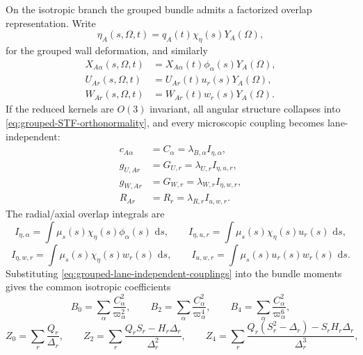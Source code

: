 \documentclass[11pt]{article}
\theoremstyle{definition}
\newcommand{\dd}{\,\mathrm{d}}
\begin{document}
On the isotropic branch the grouped bundle admits a factorized overlap representation. Write
\begin{equation}
\eta_A(s,\Omega,t)=q_A(t)\chi_\eta(s)Y_A(\Omega),
\label{eq:grouped-wall-factorization}
\end{equation}
for the grouped wall deformation, and similarly
\begin{align}
X_{A\alpha}(s,\Omega,t)&=X_{A\alpha}(t)\phi_\alpha(s)Y_A(\Omega),
\nonumber\\
U_{Ar}(s,\Omega,t)&=U_{Ar}(t)u_r(s)Y_A(\Omega),
\nonumber\\
W_{Ar}(s,\Omega,t)&=W_{Ar}(t)w_r(s)Y_A(\Omega).
\label{eq:grouped-factorized-support-gauge}
\end{align}
If the reduced kernels are $O(3)$ invariant, all angular structure collapses into \eqref{eq:grouped-STF-orthonormality}, and every microscopic coupling becomes lane-independent:
\begin{align}
c_{A\alpha}&=C_\alpha=\lambda_{B,\alpha}I_{\eta,\alpha},
\nonumber\\
g_{U,Ar}&=G_{U,r}=\lambda_{U,r}I_{\eta,u,r},
\nonumber\\
g_{W,Ar}&=G_{W,r}=\lambda_{W,r}I_{\eta,w,r},
\nonumber\\
R_{Ar}&=R_r=\lambda_{R,r}I_{u,w,r}.
\label{eq:grouped-lane-independent-couplings}
\end{align}
The radial/axial overlap integrals are
\begin{equation}
I_{\eta,\alpha}=\int \mu_s(s)\chi_\eta(s)\phi_\alpha(s)\,\dd s,
\qquad
I_{\eta,u,r}=\int \mu_s(s)\chi_\eta(s)u_r(s)\,\dd s,
\label{eq:grouped-overlap-integrals-a}
\end{equation}
\begin{equation}
I_{\eta,w,r}=\int \mu_s(s)\chi_\eta(s)w_r(s)\,\dd s,
\qquad
I_{u,w,r}=\int \mu_s(s)u_r(s)w_r(s)\,\dd s.
\label{eq:grouped-overlap-integrals-b}
\end{equation}
Substituting \eqref{eq:grouped-lane-independent-couplings} into the bundle moments gives the common isotropic coefficients
\begin{equation}
B_0=\sum_{\alpha}\frac{C_\alpha^2}{\varpi_\alpha^2},
\qquad
B_2=\sum_{\alpha}\frac{C_\alpha^2}{\varpi_\alpha^4},
\qquad
B_4=\sum_{\alpha}\frac{C_\alpha^2}{\varpi_\alpha^6},
\label{eq:isotropic-B-moments}
\end{equation}
\begin{equation}
Z_0=\sum_r \frac{Q_r}{\Delta_r},
\qquad
Z_2=\sum_r \frac{Q_rS_r-H_r\Delta_r}{\Delta_r^2},
\qquad
Z_4=\sum_r \frac{Q_r(S_r^2-\Delta_r)-S_rH_r\Delta_r}{\Delta_r^3},
\label{eq:isotropic-Z-moments}
\end{equation}
\end{document}
